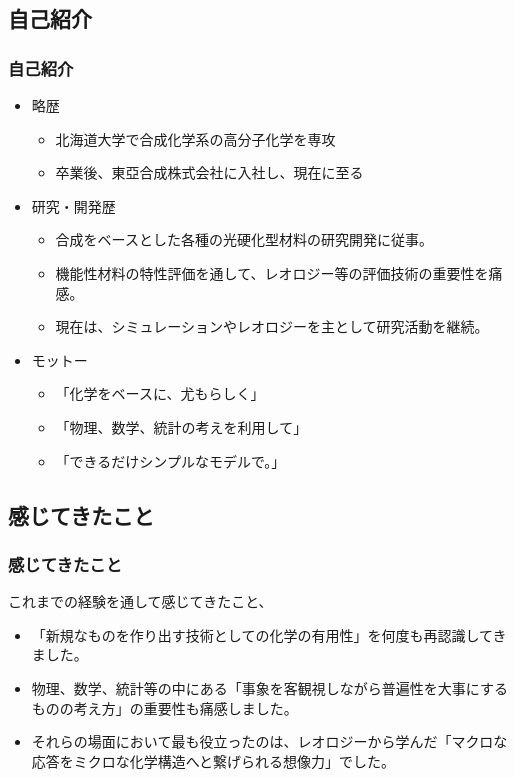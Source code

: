 \documentclass[12pt, dvipdfmx]{beamer}
\begin{document}
\subsection{自己紹介}
\begin{frame}
	\frametitle{自己紹介}
	\begin{itemize}
		\item 略歴
			\begin{itemize}
				\item 北海道大学で合成化学系の高分子化学を専攻
				\item 卒業後、東亞合成株式会社に入社し、現在に至る
			\end{itemize}
		\item  研究・開発歴
			\begin{itemize}
				\item 合成をベースとした各種の光硬化型材料の研究開発に従事。
				\item 機能性材料の特性評価を通して、レオロジー等の評価技術の重要性を痛感。
				\item 現在は、シミュレーションやレオロジーを主として研究活動を継続。
			\end{itemize}
		\item モットー
			\begin{itemize}
				\item 「化学をベースに、尤もらしく」
				\item 「物理、数学、統計の考えを利用して」
				\item 「できるだけシンプルなモデルで。」
			\end{itemize}
	\end{itemize}
	
\end{frame}

\subsection{感じてきたこと}
\begin{frame}
	\frametitle{感じてきたこと}
		これまでの経験を通して感じてきたこと、
		\begin{itemize}
			\item 「新規なものを作り出す技術としての化学の有用性」を何度も再認識してきました。
			\item 物理、数学、統計等の中にある「事象を客観視しながら普遍性を大事にするものの考え方」の重要性も痛感しました。
			\item それらの場面において最も役立ったのは、レオロジーから学んだ「マクロな応答をミクロな化学構造へと繋げられる想像力」でした。
		\end{itemize}
\end{frame}
\end{document}
